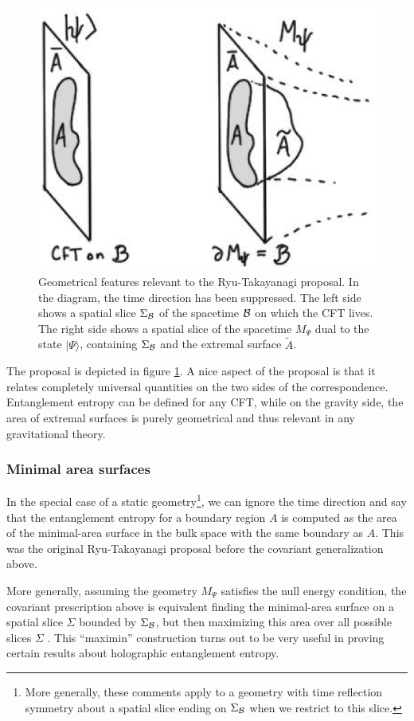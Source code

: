 \documentclass[12pt,epsf]{article}
\begin{document}
\begin{figure}
\centering
\includegraphics[width = 0.5 \textwidth]{rt.eps}
\caption{Geometrical features relevant to the Ryu-Takayanagi proposal. In the diagram, the time direction has been suppressed. The left side shows a spatial slice $\Sigma_{\cal B}$ of the spacetime ${\cal B}$ on which the CFT lives. The right side shows a spatial slice of the spacetime $M_\Psi$ dual to the state $|\Psi \rangle$, containing $\Sigma_{\cal B}$ and the extremal surface $\tilde{A}$.}
\label{rt}
\end{figure}

The proposal is depicted in figure \ref{rt}. A nice aspect of the proposal is that it relates completely universal quantities on the two sides of the correspondence. Entanglement entropy can be defined for any CFT, while on the gravity side, the area of extremal surfaces is purely geometrical and thus relevant in any gravitational theory.

\subsubsection*{Minimal area surfaces}

In the special case of a static geometry\footnote{More generally, these comments apply to a geometry with time reflection symmetry about a spatial slice ending on $\Sigma_{\cal B}$ when we restrict to this slice.}, we can ignore the time direction and say that the entanglement entropy for a boundary region $A$ is computed as the area of the minimal-area surface in the bulk space with the same boundary as $A$. This was the original Ryu-Takayanagi proposal before the covariant generalization above.

More generally, assuming the geometry $M_\Psi$ satisfies the null energy condition, the covariant prescription above is equivalent finding the minimal-area surface on a spatial slice $\Sigma$ bounded by $\Sigma_{\cal B}$, but then maximizing this area over all possible slices $\Sigma$ \cite{Wall:2012uf}. This ``maximin'' construction turns out to be very useful in proving certain results about holographic entanglement entropy.
\end{document}
